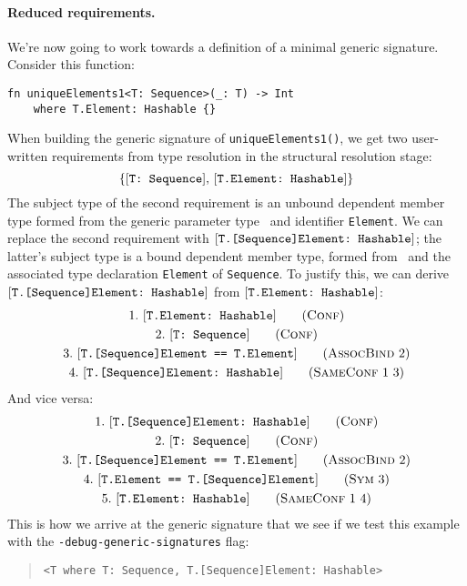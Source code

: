 \documentclass[../generics]{subfiles}
\begin{document}
\paragraph{Reduced requirements.}
We're now going to work towards a definition of a minimal generic signature. Consider this function:
\begin{Verbatim}
fn uniqueElements1<T: Sequence>(_: T) -> Int
    where T.Element: Hashable {}
\end{Verbatim}
When building the generic signature of \texttt{uniqueElements1()}, we get two user-written requirements from type resolution in the structural resolution stage:
\[\{[\texttt{T:~Sequence}],\,[\texttt{T.Element:~Hashable}]\}\]
The subject type of the second requirement is an unbound dependent member type formed from the generic parameter type \tT\ and identifier \texttt{Element}. We can replace the second requirement with $[\texttt{T.[Sequence]Element:~Hashable}]$; the latter's subject type is a bound dependent member type, formed from \tT\ and the associated type declaration \texttt{Element} of \texttt{Sequence}. To justify this, we can derive $[\texttt{T.[Sequence]Element:~Hashable}]$ from $[\texttt{T.Element:~Hashable}]$:
\begin{gather*}
\ConfStep{T.Element}{Hashable}{1}\\
\ConfStep{T}{Sequence}{2}\\
\AssocBindStep{2}{T.[Sequence]Element}{T.Element}{3}\\
\SameConfStep{1}{3}{T.[Sequence]Element}{Hashable}{4}
\end{gather*}
And vice versa:
\begin{gather*}
\ConfStep{T.[Sequence]Element}{Hashable}{1}\\
\ConfStep{T}{Sequence}{2}\\
\AssocBindStep{2}{T.[Sequence]Element}{T.Element}{3}\\
\SymStep{3}{T.Element}{T.[Sequence]Element}{4}\\
\SameConfStep{1}{4}{T.Element}{Hashable}{5}
\end{gather*}
This is how we arrive at the generic signature that we see if we test this example with the \texttt{-debug-generic-signatures} flag:
\begin{quote}
\begin{verbatim}
<T where T: Sequence, T.[Sequence]Element: Hashable>
\end{verbatim}
\end{quote}
\end{document}
